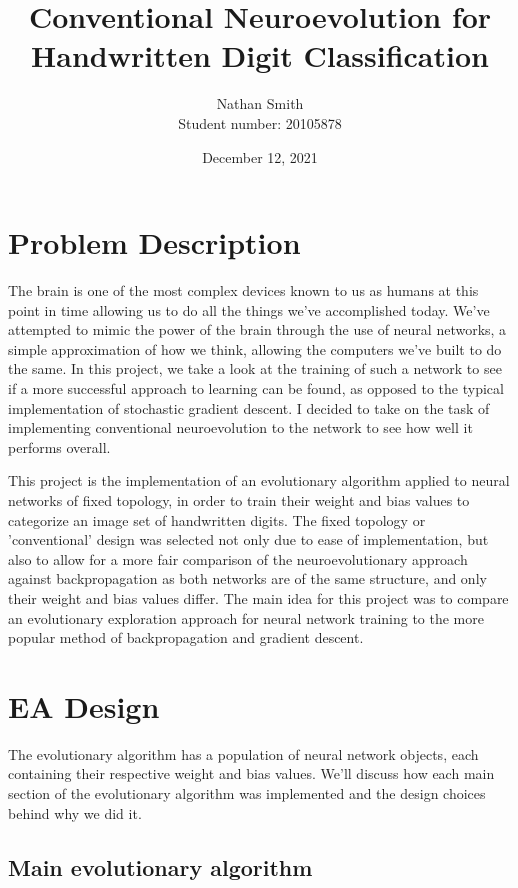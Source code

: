 \documentclass[12pt]{report}
\title{
Conventional Neuroevolution for Handwritten Digit Classification%
}
\author{Nathan Smith \\\footnotesize
Student number: 20105878\\}
\date{
December 12, 2021%
}
\begin{document}
\begin{titlepage}
    \maketitle
\end{titlepage}

\section*{Problem Description}
The brain is one of the most complex devices known to us as humans at this point in time
allowing us to do all the things we've accomplished today. We've attempted to mimic
the power of the brain through the use of neural networks, a simple approximation of
how we think, allowing the computers we've built to do the same. In this project, we
take a look at the training of such a network to see if a more successful approach to learning
can be found, as opposed to the typical implementation of stochastic gradient descent. I
decided to take on the task of implementing conventional neuroevolution to the network
to see how well it performs overall.

\par This project is the implementation of an evolutionary algorithm applied to neural
networks of fixed topology, in order to train their weight and bias values to categorize
an image set of handwritten digits. 
The fixed topology or 'conventional' design was selected not only due to ease of 
implementation, but also to allow for a more fair comparison of the neuroevolutionary
approach against backpropagation as both networks are of the same structure, and only their
weight and bias values differ. The main idea for this project was to compare an
evolutionary exploration approach for neural network training to the
more popular method of backpropagation and gradient descent.


\section*{EA Design}
The evolutionary algorithm has a population of neural network objects, each containing their
respective weight and bias values. We'll discuss how each main section of the evolutionary
algorithm was implemented and the design choices behind why we did it.


\subsection*{Main evolutionary algorithm}
\end{document}
